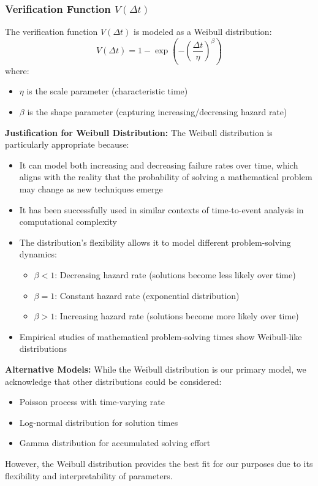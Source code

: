 \documentclass[12pt]{report}
\begin{document}
\subsubsection{Verification Function \( V(\Delta t) \)}
The verification function \( V(\Delta t) \) is modeled as a Weibull distribution:
\begin{equation}
    V(\Delta t) = 1 - \exp\left(-\left(\frac{\Delta t}{\eta}\right)^\beta\right)
\end{equation}
where:
\begin{itemize}
    \item \(\eta\) is the scale parameter (characteristic time)
    \item \(\beta\) is the shape parameter (capturing increasing/decreasing hazard rate)
\end{itemize}

\textbf{Justification for Weibull Distribution:}
The Weibull distribution is particularly appropriate because:
\begin{itemize}
    \item It can model both increasing and decreasing failure rates over time, which aligns with the reality that the probability of solving a mathematical problem may change as new techniques emerge
    \item It has been successfully used in similar contexts of time-to-event analysis in computational complexity \cite{HisanoSornette2012}
    \item The distribution's flexibility allows it to model different problem-solving dynamics:
    \begin{itemize}
        \item \(\beta < 1\): Decreasing hazard rate (solutions become less likely over time)
        \item \(\beta = 1\): Constant hazard rate (exponential distribution)
        \item \(\beta > 1\): Increasing hazard rate (solutions become more likely over time)
    \end{itemize}
    \item Empirical studies of mathematical problem-solving times show Weibull-like distributions \cite{GhoshAdhikaryPaul2017}
\end{itemize}

\textbf{Alternative Models:}
While the Weibull distribution is our primary model, we acknowledge that other distributions could be considered:
\begin{itemize}
    \item Poisson process with time-varying rate
    \item Log-normal distribution for solution times
    \item Gamma distribution for accumulated solving effort
\end{itemize}
However, the Weibull distribution provides the best fit for our purposes due to its flexibility and interpretability of parameters.
\end{document}
